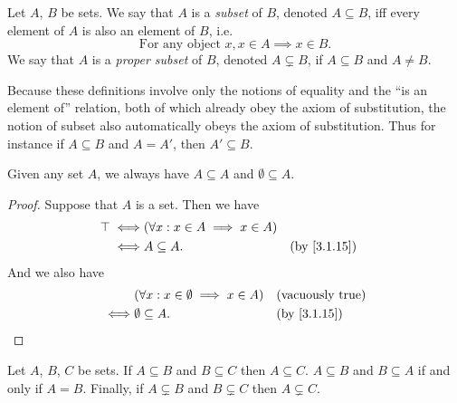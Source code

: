 \begin{defn}[Subsets]\label{3.1.15}
  Let \(A\), \(B\) be sets.
  We say that \(A\) is a \emph{subset} of \(B\), denoted \(A \subseteq B\), iff every element of \(A\) is also an element of \(B\), i.e.
  \[
    \text{For any object } x, x \in A \implies x \in B.
  \]
  We say that \(A\) is a \emph{proper subset} of \(B\), denoted \(A \subsetneq B\), if \(A \subseteq B\) and \(A \neq B\).
\end{defn}

\begin{rmk}\label{3.1.16}
  Because these definitions involve only the notions of equality and the ``is an element of'' relation, both of which already obey the axiom of substitution, the notion of subset also automatically obeys the axiom of substitution.
  Thus for instance if \(A \subseteq B\) and \(A = A'\), then \(A' \subseteq B\).
\end{rmk}

\begin{eg}\label{3.1.17}
  Given any set \(A\), we always have \(A \subseteq A\) and \(\emptyset \subseteq A\).
\end{eg}

\begin{proof}
  Suppose that \(A\) is a set.
  Then we have
  \begin{align*}
    \top \iff & (\forall x : x \in A \implies x \in A)                                \\
    \iff      & A \subseteq A.                         &  & \text{(by \cref{3.1.15})}
  \end{align*}
  And we also have
  \begin{align*}
         & (\forall x : x \in \emptyset \implies x \in A) &  & \text{(vacuously true)}   \\
    \iff & \emptyset \subseteq A.                         &  & \text{(by \cref{3.1.15})}
  \end{align*}
\end{proof}

\begin{prop}\label{3.1.18}
  Let \(A\), \(B\), \(C\) be sets.
  If \(A \subseteq B\) and \(B \subseteq C\) then \(A \subseteq C\).
  \(A \subseteq B\) and \(B \subseteq A\) if and only if \(A = B\).
  Finally, if \(A \subsetneq B\) and \(B \subsetneq C\) then \(A \subsetneq C\).
\end{prop}


